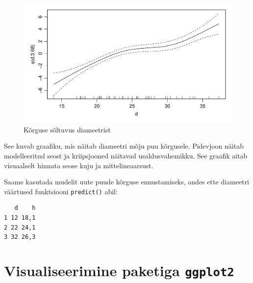\documentclass[
]{book}
\newenvironment{Shaded}{\begin{snugshade}}{\end{snugshade}}
\newcommand{\AttributeTok}[1]{\textcolor[rgb]{0.13,0.29,0.53}{#1}}
\newcommand{\CommentTok}[1]{\textcolor[rgb]{0.56,0.35,0.01}{\textit{#1}}}
\newcommand{\DecValTok}[1]{\textcolor[rgb]{0.00,0.00,0.81}{#1}}
\newcommand{\FunctionTok}[1]{\textcolor[rgb]{0.13,0.29,0.53}{\textbf{#1}}}
\newcommand{\NormalTok}[1]{#1}
\newcommand{\OtherTok}[1]{\textcolor[rgb]{0.56,0.35,0.01}{#1}}
\newcommand{\SpecialCharTok}[1]{\textcolor[rgb]{0.81,0.36,0.00}{\textbf{#1}}}
\renewenvironment{Shaded} {\begin{snugshade}\footnotesize} {\end{snugshade}}
\theoremstyle{definition}
\theoremstyle{definition}
\theoremstyle{definition}
\theoremstyle{definition}
\theoremstyle{remark}
\begin{document}
\begin{figure}[H]
\includegraphics[width=0.8\linewidth]{_main_files/figure-latex/unnamed-chunk-61-1} \caption{Kõrguse sõltuvus diameetrist}\label{fig:unnamed-chunk-61}
\end{figure}

See kuvab graafiku, mis näitab diameetri mõju puu kõrgusele. Pidevjoon näitab modelleeritud seost ja kriipsjooned näitavad usaldusvahemikku. See graafik aitab visuaalselt hinnata seose kuju ja mittelineaarsust.

Saame kasutada mudelit uute puude kõrguse ennustamiseks, andes ette diameetri väärtused funktsiooni \texttt{predict()} abil:

\begin{Shaded}
\end{Shaded}

\begin{verbatim}
   d    h
1 12 18,1
2 22 24,1
3 32 26,3
\end{verbatim}

\section{\texorpdfstring{Visualiseerimine paketiga \texttt{ggplot2}}{Visualiseerimine paketiga ggplot2}}\label{visualiseerimine-paketiga-ggplot2}
\end{document}
